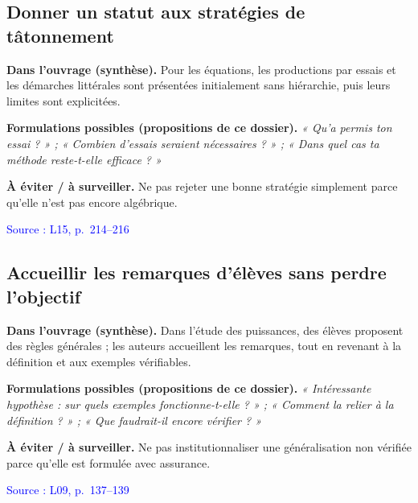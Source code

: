 \documentclass[11pt,a4paper]{article}
\newcommand{\src}[1]{\textcolor{blue}{\textsf{\footnotesize Source : #1}}}
\newcommand{\rub}[1]{\par\textbf{\textcolor{ink}{#1}}\;}
\newcommand{\geste}[5]{%
  \subsection{#1}
  \rub{Dans l'ouvrage (synthèse).} #2\par
  \rub{Formulations possibles (propositions de ce dossier).} \emph{#3}\par
  \rub{À éviter / à surveiller.} #4\par
  \src{#5}\par\medskip
}
\begin{document}
\geste{Donner un statut aux stratégies de tâtonnement}{Pour les équations, les productions par essais et les démarches littérales sont présentées initialement sans hiérarchie, puis leurs limites sont explicitées.}{« Qu'a permis ton essai ? » ; « Combien d'essais seraient nécessaires ? » ; « Dans quel cas ta méthode reste-t-elle efficace ? »}{Ne pas rejeter une bonne stratégie simplement parce qu'elle n'est pas encore algébrique.}{L15, p.~214--216}
\geste{Accueillir les remarques d'élèves sans perdre l'objectif}{Dans l'étude des puissances, des élèves proposent des règles générales ; les auteurs accueillent les remarques, tout en revenant à la définition et aux exemples vérifiables.}{« Intéressante hypothèse : sur quels exemples fonctionne-t-elle ? » ; « Comment la relier à la définition ? » ; « Que faudrait-il encore vérifier ? »}{Ne pas institutionnaliser une généralisation non vérifiée parce qu'elle est formulée avec assurance.}{L09, p.~137--139}
\end{document}

